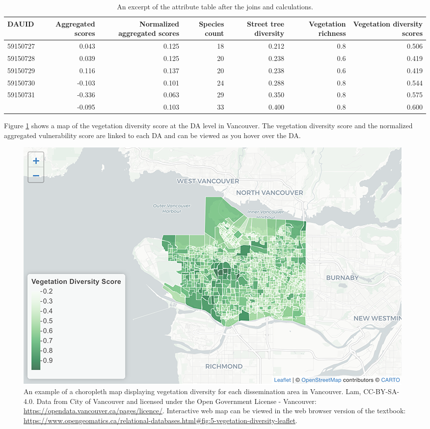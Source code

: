 \documentclass[
]{book}
\begin{document}
\begin{table}

\caption{\label{tab:5-case-study-6}An excerpt of the attribute table after the joins and calculations.}
\centering
\begin{tabular}[t]{lrrrrrr}
\toprule
DAUID & Aggregated scores & Normalized aggregated scores & Species count & Street tree diversity & Vegetation richness & Vegetation diversity scores\\
\midrule
59150727 & 0.043 & 0.125 & 18 & 0.212 & 0.8 & 0.506\\
59150728 & 0.039 & 0.125 & 20 & 0.238 & 0.6 & 0.419\\
59150729 & 0.116 & 0.137 & 20 & 0.238 & 0.6 & 0.419\\
59150730 & -0.103 & 0.101 & 24 & 0.288 & 0.8 & 0.544\\
59150731 & -0.336 & 0.063 & 29 & 0.350 & 0.8 & 0.575\\
\addlinespace
59150732 & -0.095 & 0.103 & 33 & 0.400 & 0.8 & 0.600\\
\bottomrule
\end{tabular}
\end{table}

Figure \ref{fig:5-vegetation-diversity-leaflet} shows a map of the vegetation diversity score at the DA level in Vancouver. The vegetation diversity score and the normalized aggregated vulnerability score are linked to each DA and can be viewed as you hover over the DA.



\begin{figure}
\includegraphics[width=1\linewidth]{images/05-vegetation-diversity-leaflet} \caption{An example of a choropleth map displaying vegetation diversity for each dissemination area in Vancouver. Lam, CC-BY-SA-4.0. Data from City of Vancouver and licensed under the Open Government License - Vancouver: \url{https://opendata.vancouver.ca/pages/licence/}. Interactive web map can be viewed in the web browser version of the textbook: \url{https://www.opengeomatics.ca/relational-databases.html\#fig:5-vegetation-diversity-leaflet}.}\label{fig:5-vegetation-diversity-leaflet}
\end{figure}
\end{document}

